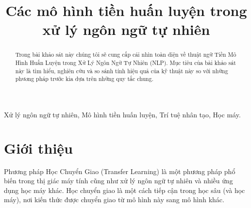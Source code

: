 \documentclass[conference]{IEEEtran}
\begin{document}
\title{Các mô hình tiền huấn luyện trong xử lý ngôn ngữ tự nhiên}

\author{
\and

\and

\and

}

\maketitle

\begin{abstract}
Trong bài khảo sát này chúng tôi sẽ cung cấp cái nhìn toàn diện về thuật ngữ Tiền Mô Hình Huấn Luyện trong Xử Lý Ngôn Ngữ Tự Nhiên (NLP). Mục tiêu của bài khảo sát này là tìm hiểu, nghiên cứu và so sánh tính hiệu quả của kỹ thuật này so với những phương pháp trước kia dựa trên những quy tắc chung.     
\end{abstract}

\begin{IEEEkeywords}
Xử lý ngôn ngữ tự nhiên, Mô hình tiền huấn luyện, Trí tuệ nhân tạo, Học máy.
\end{IEEEkeywords}

\section{Giới thiệu}
Phương pháp Học Chuyển Giao (Transfer Learning) là một phương pháp phổ biến trong thị giác máy tính cũng như xử lý ngôn ngữ tự nhiên và nhiều ứng dụng học máy khác. Học chuyển giao là một cách tiếp cận trong học sâu (và học máy), nơi kiến thức được chuyển giao từ mô hình này sang mô hình khác.
\end{document}
